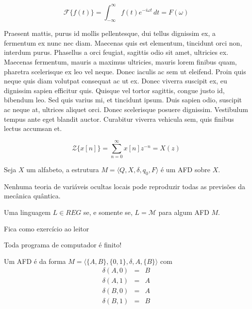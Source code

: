 \begin{equation}
  \mathcal{F}\{f(t)\} = \int_{-\infty}^{\infty} f(t) e^{-i \omega t} \, dt = F(\omega)
\end{equation}

Praesent mattis, purus id mollis pellentesque, dui tellus dignissim ex, a fermentum ex nunc nec diam. Maecenas quis est elementum, tincidunt orci non, interdum purus. Phasellus a orci feugiat, sagittis odio sit amet, ultricies ex. Maecenas fermentum, mauris a maximus ultricies, mauris lorem finibus quam, pharetra scelerisque ex leo vel neque. Donec iaculis ac sem ut eleifend. Proin quis neque quis diam volutpat consequat ac ut ex. Donec viverra suscipit ex, eu dignissim sapien efficitur quis. Quisque vel tortor sagittis, congue justo id, bibendum leo. Sed quis varius mi, et tincidunt ipsum. Duis sapien odio, suscipit ac neque at, ultrices aliquet orci. Donec scelerisque posuere dignissim. Vestibulum tempus ante eget blandit auctor. Curabitur viverra vehicula sem, quis finibus lectus accumsan et.

\begin{equation}
  \mathcal{Z}\{x[n]\} = \sum_{n=0}^{\infty} x[n] z^{-n} = X(z)
\end{equation}

\begin{definicao}
  Seja $X$ um alfabeto, a estrutura $M = \langle Q, X, \delta, q_0, F \rangle$ é um AFD sobre $X$.
\end{definicao}

\begin{teorema}
  Nenhuma teoria de variáveis ocultas locais pode reproduzir todas as previsões da mecânica quântica.
\end{teorema}

\begin{lema}
  Uma linguagem $L \in REG$ se, e somente se, $L = \mathcal{M}$ para algum AFD $M$.
\end{lema}

\begin{prova}
  Fica como exercício ao leitor
\end{prova}

\begin{Intuição}
  Toda programa de computador é finito!
\end{Intuição}

\begin{exemplo}
  Um AFD é da forma $M = \langle \{A, B\}, \{0, 1\}, \delta, A, \{B\} \rangle$ com 
  \begin{eqnarray*}
    \delta(A, 0) & = & B\\
    \delta(A, 1) & = & A\\
    \delta(B, 0) & = & A\\
    \delta(B, 1) & = & B\\
  \end{eqnarray*}
\end{exemplo}

